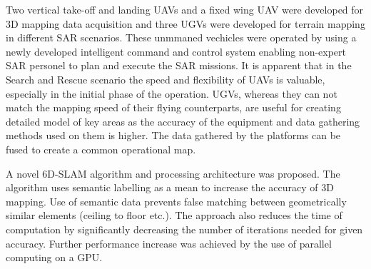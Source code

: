 \documentclass{article}
\begin{document}
Two vertical take-off and landing UAVs and a fixed wing UAV were developed for 3D mapping data acquisition and three UGVs were developed for terrain mapping in different SAR scenarios.
These unmmaned vechicles were operated by using a newly developed intelligent command and control system enabling non-expert SAR personel to plan and execute the SAR missions.
It is apparent that in the Search and Rescue scenario the speed and flexibility of UAVs is valuable, especially in the initial phase of the operation. UGVs, whereas they can not match the mapping speed of their flying counterparts, are useful for creating detailed model of key areas as the accuracy of the equipment and data gathering methods used on them is higher. The data gathered by the platforms can be fused to create a common operational map.
	
	
A novel 6D-SLAM algorithm and processing architecture was proposed. The algorithm uses semantic labelling as a mean to increase the accuracy of 3D mapping. Use of semantic data prevents false matching between geometrically similar elements (ceiling to floor etc.).
The approach also reduces the time of computation by significantly decreasing the number of iterations needed for given accuracy.
Further performance increase was achieved by the use of parallel computing on a GPU.
	
\end{document}
